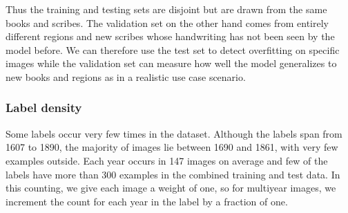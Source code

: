 Thus the training and testing sets are disjoint but are drawn from the same books and scribes. The validation set on the other hand comes from entirely different regions and new scribes whose handwriting has not been seen by the model before. We can therefore use the test set to detect overfitting on specific images while the validation set can measure how well the model generalizes to new books and regions as in a realistic use case scenario.



\subsubsection{Label density} \label{sssec:few_labels}

Some labels occur very few times in the dataset. Although the labels span from 1607 to 1890, the majority of images lie between 1690 and 1861, with very few examples outside. Each year occurs in 147 images on average and few of the labels have more than 300 examples in the combined training and test data.
In this counting, we give each image a weight of one, so for multiyear images, we increment the count for each year in the label by a fraction of one.
